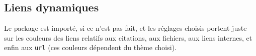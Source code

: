 \documentclass{tutodoc}
\begin{document}
\subsection{Liens dynamiques}

Le package  est importé, si ce n'est pas fait, et les réglages choisis portent juste sur les couleurs des liens relatifs aux citations, aux fichiers, aux liens internes, et enfin aux \verb#url# (ces couleurs dépendent du thème choisi).
\end{document}
